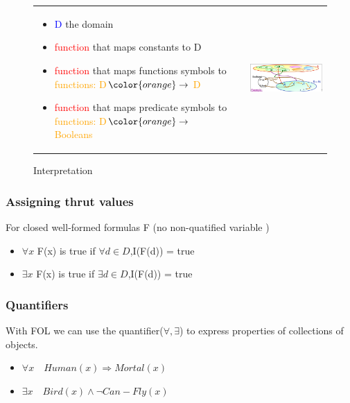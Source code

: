  \begin{figure}[h]
     \begin{tabular}{m{7.5cm}m{1cm}m{8cm}}
     \begin{itemize}
         \item \textcolor{blue}{D} the domain
         \item \textcolor{red}{function} that maps constants to D
         \item \textcolor{red}{function} that maps functions symbols to 
             \textcolor{orange}{functions: D$\color{orange}\to$ D}
         \item \textcolor{red}{function} that maps predicate symbols to 
             \textcolor{orange}{functions: D$\color{orange}\to$ Booleans}
     \end{itemize}
     &&
     \includegraphics[width=8cm]{fol_inter.png}
 \end{tabular}
 \caption{Interpretation}
 \end{figure}

 \subsubsection{Assigning thrut values}

 For closed well-formed formulas F (no non-quatified variable )

	\begin{itemize}
		\item $\forall x$ F(x) is true if $\forall d\in D$,I(F(d)) = true
		\item $\exists x$ F(x) is true if $\exists d\in D$,I(F(d)) = true
	\end{itemize}



    \subsubsection{Quantifiers}

 With  FOL  we  can  use the  quantifier($\forall,\exists$)  to  express
properties of collections of objects.

	\begin{itemize}
		\item $\forall x\quad Human(x) \Rightarrow Mortal(x)$
		\item $\exists x \quad Bird(x) \wedge \neg Can-Fly(x)$
	\end{itemize}

